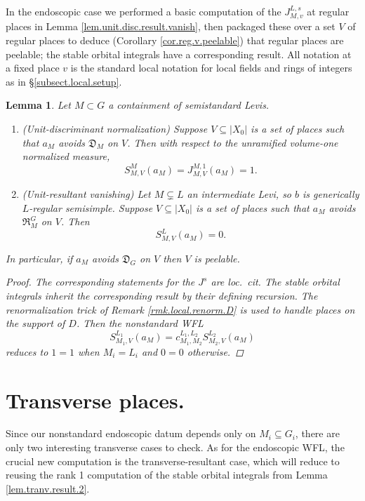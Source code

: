 \documentclass[openany]{amsbook}
\newtheorem{lemma}[theorem]{Lemma}
\theoremstyle{definition}
\theoremstyle{remark}
\numberwithin{equation}{section}
\renewcommand{\-}{\operatorname{-}}
\newcommand{\fD}{\mathfrak{D}}
\newcommand{\fR}{\mathfrak{R}}
\begin{document}
In the endoscopic case we performed a basic computation of the $J_{M,v}^{L,s}$ at regular places in Lemma \ref{lem.unit.disc.result.vanish}, then packaged these over a set $V$ of regular places to deduce (Corollary \ref{cor.reg.v.peelable}) that regular places are peelable; the stable orbital integrals have a corresponding result. All notation at a fixed place $v$ is the standard local notation for local fields and rings of integers as in \S \ref{subsect.local.setup}.
\begin{lemma}\label{lem.nonstd.peel.regular}
    Let $M \subset G$ a containment of semistandard Levis.
    \begin{enumerate}
        \item (Unit-discriminant normalization) Suppose $V \subseteq |X_0|$ is a set of places such that $a_M$ avoids $\fD_M$ on $V$. Then with respect to the unramified volume-one normalized measure,
        $$
            S_{M,V}^{M}(a_M) = J_{M,V}^{M, 1}(a_M) = 1.
        $$
        \item (Unit-resultant vanishing) Let $M \subsetneq L$ an intermediate Levi, so $b$ is generically $L$-regular semisimple. Suppose $V \subseteq |X_0|$ is a set of places such that $a_M$ avoids $\fR_M^G$ on $V$. Then
        $$
            S_{M,V}^L(a_M) = 0.
        $$
    \end{enumerate}
    In particular, if $a_M$ avoids $\fD_G$ on $V$ then $V$ is peelable.
    \begin{proof}
        The corresponding statements for the $J^s$ are \textit{loc.\ cit.} The stable orbital integrals inherit the corresponding result by their defining recursion. The renormalization trick of Remark \ref{rmk.local.renorm.D} is used to handle places on the support of $D$. Then the nonstandard WFL
        $$
            S_{M_1, V}^{L_1}(a_M) = c_{M_1, M_2}^{L_1, L_2} S_{M_2, V}^{L_2}(a_M)
        $$
        reduces to $1 = 1$ when $M_i = L_i$ and $0 = 0$ otherwise.
    \end{proof}
\end{lemma}

\section{Transverse places.}\label{subsect.nonstd.transverse}

Since our nonstandard endoscopic datum depends only on $M_i \subseteq G_i$, there are only two interesting transverse cases to check. As for the endoscopic WFL, the crucial new computation is the transverse-resultant case, which will reduce to reusing the rank 1 computation of the stable orbital integrals from Lemma \ref{lem.tranv.result.2}.
\end{document}
